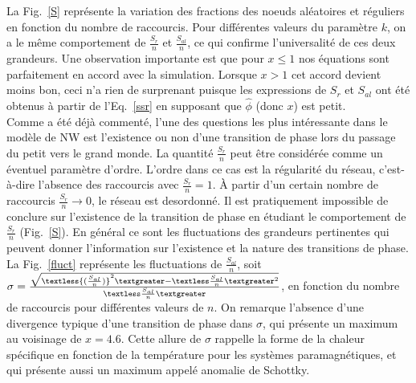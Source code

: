La Fig.~\ref{S} représente la variation des fractions des noeuds aléatoires et réguliers en fonction du nombre de raccourcis. Pour différentes valeurs du paramètre $k$, on a le même comportement de  $\frac{S_{r}}{n}$ et $\frac{S_{al}}{n}$, ce qui confirme l'universalité de ces deux grandeurs. Une observation importante est que pour $x\le1$ nos équations sont parfaitement en accord avec la simulation. Lorsque $x>1$ cet accord devient moins bon, ceci n'a rien de surprenant puisque les expressions de $S_{r}$ et $S_{al}$ ont été obtenus à partir de l'Eq.~\ref{ssr} en supposant que $\hat{\phi}$ (donc $x$) est petit.\\
Comme a été déjà commenté, l'une des questions les plus intéressante dans le modèle de NW est l'existence ou non d'une transition de phase lors du passage du petit vers le grand monde. La quantité $\frac{S_{r}}{n}$ peut être considérée comme un éventuel paramètre d'ordre. L'ordre dans ce cas est la régularité du réseau, c'est-à-dire l'absence des raccourcis avec $\frac{S_{r}}{n}=1$. \`{A} partir d'un certain nombre de raccourcis $\frac{S_{r}}{n} \longrightarrow 0$, le réseau est desordonné. Il est pratiquement impossible de conclure sur l'existence de la transition de phase en étudiant le comportement de  $\frac{S_{r}}{n}$ (Fig.~\ref{S}). En général ce sont les fluctuations des grandeurs pertinentes qui peuvent donner l'information sur l'existence et la nature des transitions de phase. La Fig.~\ref{fluct} représente les fluctuations de $\frac{S_{al}}{n}$, soit  $\sigma=\frac{\sqrt{\textless{( \frac{S_{al}}{n})}^2\textgreater-\textless \frac{S_{al}}{n}\textgreater^2}}{\textless \frac{S_{al}}{n}\textgreater}$, en fonction du nombre de raccourcis  pour différentes valeurs de $n$. On remarque l'absence d'une divergence typique d'une transition de phase dans $\sigma$, qui présente un maximum au voisinage de $x=4.6$. Cette allure de $\sigma$ rappelle la forme de la chaleur spécifique en fonction de la température pour les systèmes paramagnétiques, et qui présente aussi un maximum appelé anomalie de Schottky.  

